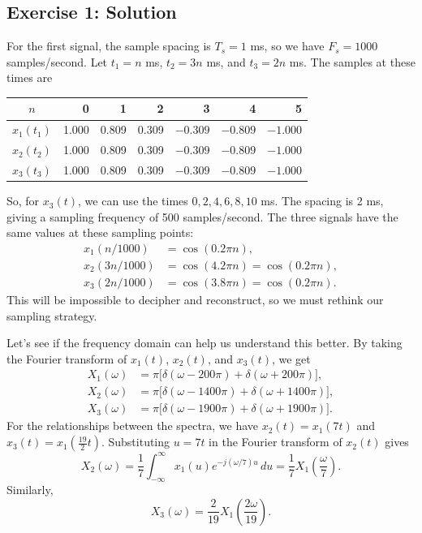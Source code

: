 \subsection*{Exercise 1: Solution}
For the first signal, the sample spacing is $T_s=1$ ms, so we have
$F_s=1000$ samples/second. Let $t_1=n$ ms, $t_2=3n$ ms, and $t_3=2n$ ms.
The samples at these times are
\begin{center}
\begin{tabular}{c|rrrrrr}
$n$ & 0 & 1 & 2 & 3 & 4 & 5 \\
\hline
$x_1(t_1)$ & 1.000 & 0.809 & 0.309 & $-0.309$ & $-0.809$ & $-1.000$ \\
$x_2(t_2)$ & 1.000 & 0.809 & 0.309 & $-0.309$ & $-0.809$ & $-1.000$ \\
$x_3(t_3)$ & 1.000 & 0.809 & 0.309 & $-0.309$ & $-0.809$ & $-1.000$
\end{tabular}
\end{center}
So, for $x_3(t)$, we can use the times $0,2,4,6,8,10$ ms.
The spacing is 2 ms, giving a sampling frequency of 500 samples/second.
The three signals have the same values at these sampling points:
\[
\begin{aligned}
x_1(n/1000)&=\cos(0.2\pi n),\\
x_2(3n/1000)&=\cos(4.2\pi n)=\cos(0.2\pi n),\\
x_3(2n/1000)&=\cos(3.8\pi n)=\cos(0.2\pi n).
\end{aligned}
\]
This will be impossible to decipher and reconstruct, so we must rethink
our sampling strategy.

Let's see if the frequency domain can help us understand this better.
By taking the Fourier transform of $x_1(t)$, $x_2(t)$, and $x_3(t)$, we get
\[
\begin{aligned}
X_1(\omega)&=\pi\big[\delta(\omega-200\pi)+\delta(\omega+200\pi)\big],\\
X_2(\omega)&=\pi\big[\delta(\omega-1400\pi)+\delta(\omega+1400\pi)\big],\\
X_3(\omega)&=\pi\big[\delta(\omega-1900\pi)+\delta(\omega+1900\pi)\big].
\end{aligned}
\]
For the relationships between the spectra, we have $x_2(t)=x_1(7t)$ and
$x_3(t)=x_1(\frac{19}{2}t)$. Substituting $u=7t$ in the Fourier transform of $x_2(t)$
gives
\[
X_2(\omega)=\frac{1}{7}\int_{-\infty}^{\infty}
x_1(u)e^{-j(\omega/7)u}\,du
=\frac{1}{7}X_1\!\left(\frac{\omega}{7}\right).
\]
Similarly,
\[
X_3(\omega)=\frac{2}{19}X_1\!\left(\frac{2\omega}{19}\right).
\]

